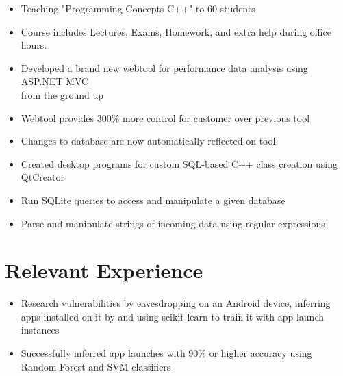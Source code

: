 \documentclass{Custom_CV}
\begin{document}
\begin{itemize}[noitemsep]
    \item Teaching "Programming Concepts C++" to 60 students
    \item Course includes Lectures, Exams, Homework, and extra help during office hours.
\end{itemize}
\begin{itemize}[rightmargin=\dimexpr\linewidth-15cm-\leftmargin\relax,noitemsep]
    \item Developed a brand new webtool for performance data analysis using ASP.NET MVC\\ from the ground up
    \item Webtool provides 300\% more control for customer over previous tool
    \item Changes to database are now automatically reflected on tool
\end{itemize}
\begin{itemize}[rightmargin=\dimexpr\linewidth-15cm-\leftmargin\relax,noitemsep]
\item Created desktop programs for custom SQL-based C++ class creation using QtCreator
\item Run SQLite queries to access and manipulate a given database
\item Parse and manipulate strings of incoming data using regular expressions
\end{itemize}

\section{Relevant Experience}
\begin{itemize}[rightmargin=\dimexpr\linewidth-15cm-\leftmargin\relax,noitemsep]
\item Research vulnerabilities by eavesdropping on an Android device, inferring apps installed on it by and using scikit-learn to train it with app launch instances
\item Successfully inferred app launches with 90\% or higher accuracy using Random Forest and SVM classifiers
\end{itemize}
\end{document}
